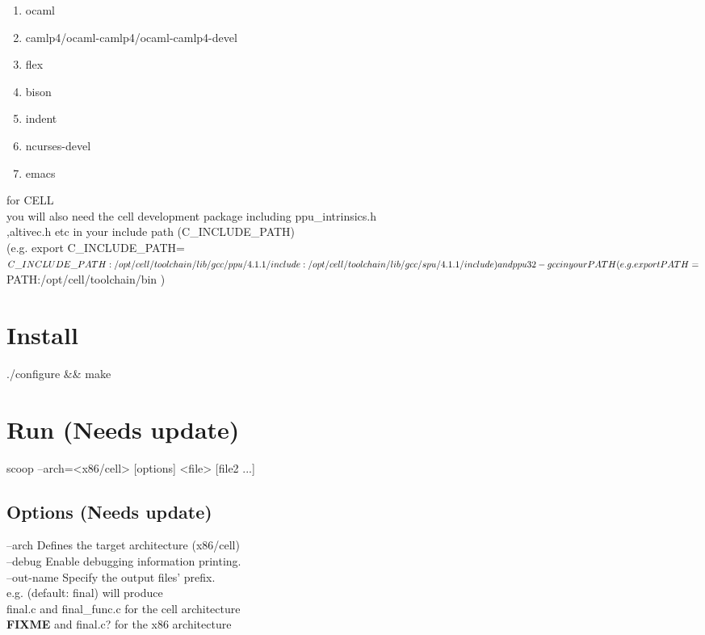 \documentclass[letterpaper]{article}
\begin{document}
\begin{enumerate}
  \item ocaml
  \item camlp4/ocaml-camlp4/ocaml-camlp4-devel
  \item flex
  \item bison
  \item indent
  \item ncurses-devel
  \item emacs
\end{enumerate}

for CELL\\
  you will also need the cell development package including ppu\_intrinsics.h\\
  ,altivec.h etc in your include path (C\_INCLUDE\_PATH)\\
  (e.g. export C\_INCLUDE\_PATH=$C\_INCLUDE\_PATH:/opt/cell/toolchain/lib/gcc/ppu/4.1.1/include:/opt/cell/toolchain/lib/gcc/spu/4.1.1/include )\\
  and ppu32-gcc in your PATH\\
  (e.g. export PATH=$PATH:/opt/cell/toolchain/bin )\\

\section{Install}

  ./configure \&\& make

\section{Run (Needs update)}

  scoop --arch=<x86/cell> [options] <file> [file2 ...]

\subsection{Options (Needs update)}

  --arch  Defines the target architecture (x86/cell)\\

  --debug Enable debugging information printing.\\

  --out-name Specify the output files' prefix.\\
          e.g. (default: final) will produce \\
          final.c and final\_func.c for the cell architecture\\
\textbf{FIXME}         and final.c? for the x86 architecture\\
\end{document}
